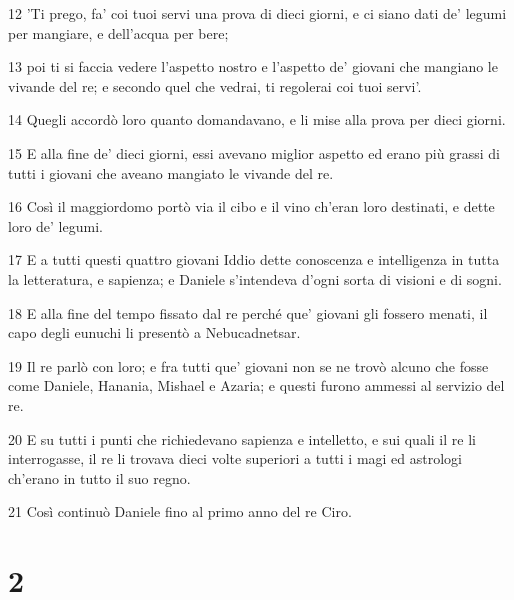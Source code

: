 \par 12 'Ti prego, fa' coi tuoi servi una prova di dieci giorni, e ci siano dati de' legumi per mangiare, e dell'acqua per bere;
\par 13 poi ti si faccia vedere l'aspetto nostro e l'aspetto de' giovani che mangiano le vivande del re; e secondo quel che vedrai, ti regolerai coi tuoi servi'.
\par 14 Quegli accordò loro quanto domandavano, e li mise alla prova per dieci giorni.
\par 15 E alla fine de' dieci giorni, essi avevano miglior aspetto ed erano più grassi di tutti i giovani che aveano mangiato le vivande del re.
\par 16 Così il maggiordomo portò via il cibo e il vino ch'eran loro destinati, e dette loro de' legumi.
\par 17 E a tutti questi quattro giovani Iddio dette conoscenza e intelligenza in tutta la letteratura, e sapienza; e Daniele s'intendeva d'ogni sorta di visioni e di sogni.
\par 18 E alla fine del tempo fissato dal re perché que' giovani gli fossero menati, il capo degli eunuchi li presentò a Nebucadnetsar.
\par 19 Il re parlò con loro; e fra tutti que' giovani non se ne trovò alcuno che fosse come Daniele, Hanania, Mishael e Azaria; e questi furono ammessi al servizio del re.
\par 20 E su tutti i punti che richiedevano sapienza e intelletto, e sui quali il re li interrogasse, il re li trovava dieci volte superiori a tutti i magi ed astrologi ch'erano in tutto il suo regno.
\par 21 Così continuò Daniele fino al primo anno del re Ciro.

\chapter{2}

